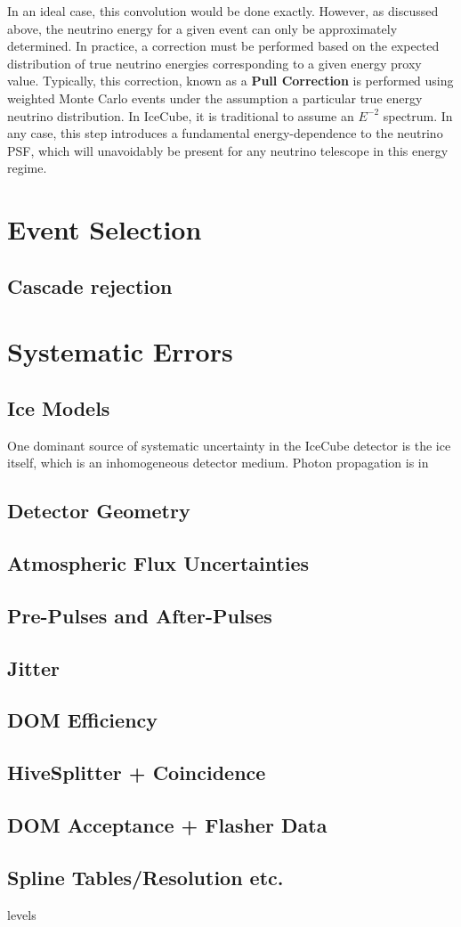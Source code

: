In an ideal case, this convolution would be done exactly. However, as discussed above, the neutrino energy for a given event can only be approximately determined. In practice, a correction must be performed based on the expected distribution of true neutrino energies corresponding to a given energy proxy value. Typically, this correction, known as a \textbf{Pull Correction} is performed using weighted Monte Carlo events under the assumption a particular true energy neutrino distribution. In IceCube, it is traditional to assume an $E^{-2}$  spectrum. In any case, this step introduces a fundamental energy-dependence to the neutrino PSF, which will unavoidably be present for any neutrino telescope in this energy regime. 


\section{Event Selection}
\subsection{Cascade rejection}
\section{Systematic Errors}
\subsection{Ice Models}
One dominant source of systematic uncertainty in the IceCube detector is the ice itself, which is an inhomogeneous detector medium. Photon propagation is in
\subsection{Detector Geometry}
\subsection{Atmospheric Flux Uncertainties}
\subsection{Pre-Pulses and After-Pulses}
\subsection{Jitter}
\subsection{DOM Efficiency}
\subsection{HiveSplitter + Coincidence}
\subsection{DOM Acceptance + Flasher Data}
\subsection{Spline Tables/Resolution etc.}
levels